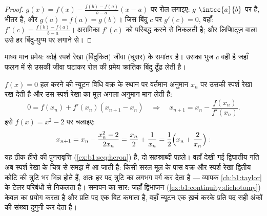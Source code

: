 \begin{proof}
$g(x) = f(x) - \frac{f(b) - f(a)}{b - a}(x - a)$ पर रोल लगाइए: $g$
$\intcc{a}{b}$ पर  है, भीतर  है, और $g(a) = f(a) = g(b)$। जिस
बिंदु $c$ पर $g'(c) = 0$, वहाँ: $f'(c) = \frac{f(b)-f(a)}{b-a}$। असमिका
$f'(c)$ को परिबद्ध करने से निकलती है; और लिप्शिट्ज़ वाला  उसे हर
बिंदु-युग्म पर लगाने से।
\end{proof}

\begin{omfigure}

{\small माध्य मान प्रमेय: कोई स्पर्श रेखा (बिंदुकित) जीवा (धूसर) के समांतर
है। उसका भुज $c$ वही है जहाँ फलन में से उसकी जीवा घटाकर रोल की प्रमेय
क्रांतिक बिंदु ढूँढ़ लेती है।}
\end{omfigure}

\begin{example}[न्यूटन की विधि हीरो की ही है]\label{ex:b1:derivative:newton}
$f(x) = 0$ हल करने की न्यूटन विधि वक्र के स्थान पर वर्तमान अनुमान $x_n$ पर
उसकी स्पर्श रेखा रख देती है और उस स्पर्श रेखा का मूल अगला अनुमान मान लेती
है:
\[
0 = f(x_n) + f'(x_n)(x_{n+1} - x_n)
\quad\Longrightarrow\quad
x_{n+1} = x_n - \frac{f(x_n)}{f'(x_n)} .
\]
इसे $f(x) = x^2 - 2$ पर चलाइए:
\[
x_{n+1} = x_n - \frac{x_n^2 - 2}{2x_n}
= \frac{x_n}{2} + \frac{1}{x_n}
= \frac12\Bigl(x_n + \frac{2}{x_n}\Bigr) :
\]
यह ठीक हीरो की पुनरावृत्ति (\cref{ex:b1:seq:heron}) है, दो सहस्राब्दी पहले।
वहाँ देखी गई द्विघातीय गति अब स्पर्श रेखा के चित्र से समझ में आ जाती है:
किसी सरल मूल के पास वक्र और स्पर्श रेखा द्वितीय कोटि की त्रुटि भर भिन्न होते
हैं, अतः हर पद त्रुटि का लगभग वर्ग कर देता है --- व्यापक 
\cref{ch:b1:taylor} के टेलर परिबंधों से निकलता है। समापन का सार: जहाँ
द्विभाजन (\cref{ex:b1:continuity:dichotomy}) केवल  का प्रयोग करता है
और प्रति पद एक बिट कमाता है, वहाँ न्यूटन एक  ख़र्च करके प्रति पद सही
अंकों की संख्या दुगुनी कर देता है।
\end{example}

